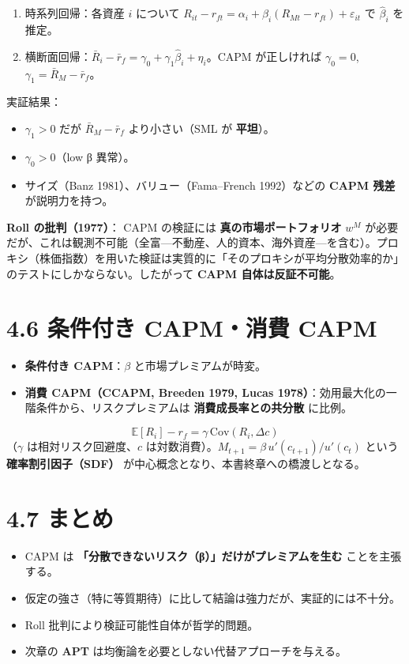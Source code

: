 \documentclass[11pt,a4paper]{report}
\begin{document}
\begin{enumerate}
\item 時系列回帰：各資産 $i$ について $R_{it} - r_{ft} = \alpha_i + \beta_i (R_{Mt} - r_{ft}) + \varepsilon_{it}$ で $\hat\beta_i$ を推定。
\item 横断面回帰：$\bar R_i - \bar r_f = \gamma_0 + \gamma_1 \hat\beta_i + \eta_i$。CAPM が正しければ $\gamma_0 = 0$, $\gamma_1 = \bar R_M - \bar r_f$。
\end{enumerate}

実証結果：
\begin{itemize}
\item $\gamma_1 > 0$ だが $\bar R_M - \bar r_f$ より小さい（SML が \textbf{平坦}）。
\item $\gamma_0 > 0$（low β 異常）。
\item サイズ（Banz 1981）、バリュー（Fama–French 1992）などの \textbf{CAPM 残差} が説明力を持つ。
\end{itemize}

\textbf{Roll の批判（1977）}： CAPM の検証には \textbf{真の市場ポートフォリオ} $w^M$ が必要だが、これは観測不可能（全富—不動産、人的資本、海外資産—を含む）。プロキシ（株価指数）を用いた検証は実質的に「そのプロキシが平均分散効率的か」のテストにしかならない。したがって \textbf{CAPM 自体は反証不可能}。

\section{4.6 条件付き CAPM・消費 CAPM}

\begin{itemize}
\item \textbf{条件付き CAPM}：$\beta$ と市場プレミアムが時変。
\item \textbf{消費 CAPM（CCAPM, Breeden 1979, Lucas 1978）}：効用最大化の一階条件から、リスクプレミアムは \textbf{消費成長率との共分散} に比例。
\end{itemize}
\[ \mathbb{E}[R_i] - r_f = \gamma\, \mathrm{Cov}(R_i, \Delta c) \] （$\gamma$ は相対リスク回避度、$c$ は対数消費）。$M_{t+1} = \beta\, u'(c_{t+1})/u'(c_t)$ という \textbf{確率割引因子（SDF）} が中心概念となり、本書終章への橋渡しとなる。

\section{4.7 まとめ}

\begin{itemize}
\item CAPM は \textbf{「分散できないリスク（β）」だけがプレミアムを生む} ことを主張する。
\item 仮定の強さ（特に等質期待）に比して結論は強力だが、実証的には不十分。
\item Roll 批判により検証可能性自体が哲学的問題。
\item 次章の \textbf{APT} は均衡論を必要としない代替アプローチを与える。
\end{itemize}
\end{document}
